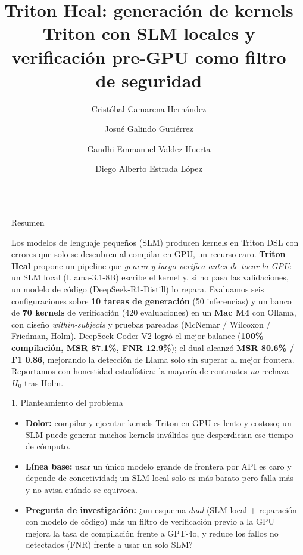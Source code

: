 \documentclass[final]{beamer}
\title{Triton Heal: generación de kernels Triton con SLM locales y verificación pre-GPU como filtro de seguridad}
\author{Cristóbal Camarena Hernández \and Josué Galindo Gutiérrez \and Gandhi Emmanuel Valdez Huerta \and Diego Alberto Estrada López}
\institute[shortinst]{Tecnológico de Monterrey --- TC3002B (ACA-2026) --- Equipo 11}
\newlength{\sepwidth}
\newlength{\colwidth}
\newcommand{\separatorcolumn}{\begin{column}{\sepwidth}\end{column}}
\begin{document}
\begin{frame}[t]
\begin{columns}[t]
\separatorcolumn

\begin{column}{\colwidth}

  \begin{block}{Resumen}

    Los modelos de lenguaje pequeños (SLM) producen kernels en Triton DSL con
    errores que solo se descubren al compilar en GPU, un recurso caro.
    \textbf{Triton Heal} propone un pipeline que \emph{genera y luego verifica
    antes de tocar la GPU}: un SLM local (Llama-3.1-8B) escribe el kernel y, si
    no pasa las validaciones, un modelo de código (DeepSeek-R1-Distill) lo repara.
    Evaluamos seis configuraciones sobre \textbf{10 tareas de generación}
    (50 inferencias) y un banco de \textbf{70 kernels} de verificación
    (420 evaluaciones) en un \textbf{Mac M4} con Ollama, con diseño
    \emph{within-subjects} y pruebas pareadas (McNemar / Wilcoxon / Friedman,
    Holm). DeepSeek-Coder-V2 logró el mejor balance (\textbf{100\% compilación,
    MSR 87.1\%, FNR 12.9\%}); el dual alcanzó \textbf{MSR 80.6\% / F1 0.86},
    mejorando la detección de Llama solo sin superar al mejor frontera.
    Reportamos con honestidad estadística: la mayoría de contrastes \emph{no}
    rechaza $H_0$ tras Holm.

  \end{block}

  \begin{block}{1. Planteamiento del problema}

    \begin{itemize}
      \item \textbf{Dolor:} compilar y ejecutar kernels Triton en GPU es lento
        y costoso; un SLM puede generar muchos kernels inválidos que
        desperdician ese tiempo de cómputo.
      \item \textbf{Línea base:} usar un único modelo grande de frontera por
        API es caro y depende de conectividad; un SLM local solo es más barato
        pero falla más y no avisa cuándo se equivoca.
      \item \textbf{Pregunta de investigación:} ¿un esquema \emph{dual}
        (SLM local + reparación con modelo de código) más un filtro de
        verificación previo a la GPU mejora la tasa de compilación frente a
        GPT-4o, y reduce los fallos no detectados (FNR) frente a usar un solo
        SLM?
    \end{itemize}


\end{block}
\end{column}
\end{columns}
\end{frame}
\end{document}
